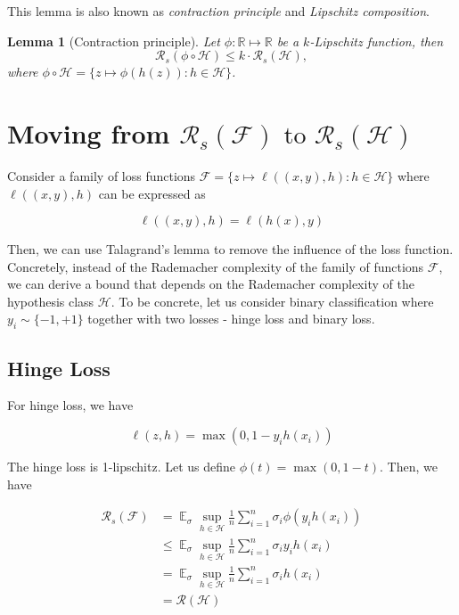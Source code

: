\documentclass[11pt]{article}
\DeclareMathOperator*{\E}{\mathbb{E}}
\newtheorem{lemma}{Lemma}
\begin{document}
This lemma is also known as \emph{contraction principle} and \emph{Lipschitz composition}.

\begin{lemma}[Contraction principle]
Let $\phi:\mathbb{R}\mapsto\mathbb{R}$ be a $k$-Lipschitz function, then
\begin{equation}
    \mathcal{R}_s(\phi \circ \mathcal{H}) \leq k\cdot \mathcal{R}_s(\mathcal{H}),
\end{equation}
where $\phi\circ\mathcal{H} = \{z \mapsto \phi(h(z)):h \in \mathcal{H}\}$.
\end{lemma}

\section{Moving from $\mathcal{R}_s(\mathcal{F}) \text{ to } \mathcal{R}_s(\mathcal{H})$}

Consider a family of loss functions $\mathcal{F} = \{ z \mapsto \ell((x,y),h):h\in\mathcal{H}\}$ where $\ell((x,y),h)$ can be expressed as

\[ \ell((x,y),h) = \ell(h(x),y)\]

Then, we can use Talagrand's lemma to remove the influence of the loss function. Concretely, instead of the Rademacher complexity of the family of functions $\mathcal{F}$, we can derive a bound that depends on the Rademacher complexity of the hypothesis class $\mathcal{H}$. To be concrete, let us consider binary classification where $y_i \sim \{-1,+1\}$ together with two losses - hinge loss and binary loss.

\subsection{Hinge Loss}

For hinge loss, we have

\[ \ell(z,h) = \max{(0,1-y_{i}h(x_i))}\]

The hinge loss is 1-lipschitz. Let us define $\phi(t) = \max{(0,1-t)}$. Then, we have

\begin{align*}
    \mathcal{R}_s(\mathcal{F}) &= \E_{\sigma} \sup_{h \in \mathcal{H}} \frac{1}{n} \sum_{i=1}^n \sigma_i \phi(y_{i}h(x_i)) \\
    &\leq \E_{\sigma} \sup_{h \in \mathcal{H}} \frac{1}{n} \sum_{i=1}^n \sigma_{i} y_{i} h(x_i) \\
    &= \E_{\sigma} \sup_{h \in \mathcal{H}} \frac{1}{n} \sum_{i=1}^n \sigma_{i} h(x_i) \\
    &= \mathcal{R}(\mathcal{H})
\end{align*}
\end{document}
